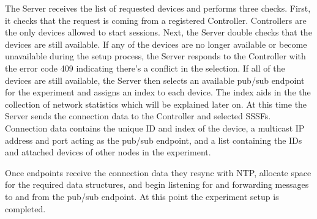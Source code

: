 \documentclass[letterpaper,twocolumn,12pt]{article}
\begin{document}
The Server receives the list of requested devices and performs three checks. First, it checks that the request is coming from a registered Controller. Controllers are the only devices allowed to start sessions. Next, the Server double checks that the devices are still available. If any of the devices are no longer available or become unavailable during the setup process, the Server responds to the Controller with the error code 409 indicating there's a conflict in the selection. If all of the devices are still available, the Server then selects an available pub/sub endpoint for the experiment and assigns an index to each device. The index aids in the the collection of network statistics which will be explained later on. At this time the Server sends the connection data to the Controller and selected SSSFs. Connection data contains the unique ID and index of the device, a multicast IP address and port acting as the pub/sub endpoint, and a list containing the IDs and attached devices of other nodes in the experiment.

Once endpoints receive the connection data they resync with NTP, allocate space for the required data structures, and begin listening for and forwarding messages to and from the pub/sub endpoint. At this point the experiment setup is completed.
\end{document}

